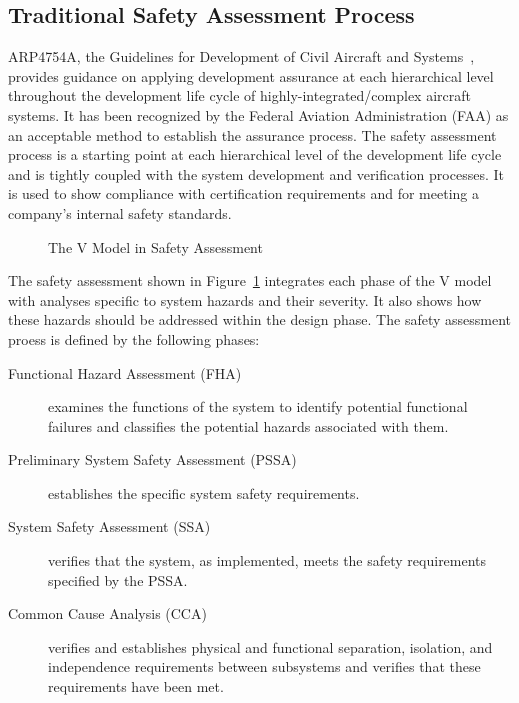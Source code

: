 \subsection{Traditional Safety Assessment Process}
ARP4754A, the Guidelines for Development of Civil Aircraft and Systems~\cite{SAE:ARP4754A}, provides guidance on applying development assurance at each hierarchical level throughout the development life cycle of highly-integrated/complex aircraft systems. It has been recognized by the Federal Aviation Administration (FAA) as an acceptable method to establish the assurance process. The safety assessment process is a starting point at each hierarchical level of the development life cycle and is tightly coupled with the system development and verification processes. It is used to show compliance with certification requirements and for meeting a company's internal safety standards. 

\begin{figure}[!htb]
        \caption{\label{fig:v2} The V Model in Safety Assessment}
\end{figure}

The safety assessment shown in Figure~\ref{fig:v2} integrates each phase of the V model with analyses specific to system hazards and their severity. It also shows how these hazards should be addressed within the design phase. The safety assessment proess is defined by the following phases:

\begin{description}
\item[Functional Hazard Assessment (FHA)] examines the functions of the system to identify potential functional failures and classifies the potential hazards associated with them. 

\item[Preliminary System Safety Assessment (PSSA)] establishes the specific system safety requirements.

\item[System Safety Assessment (SSA)] verifies that the system, as implemented, meets the safety requirements specified by the PSSA.

\item[Common Cause Analysis (CCA)] verifies and establishes physical and functional separation, isolation, and independence requirements between subsystems and verifies that these requirements have been met.

\end{description}

